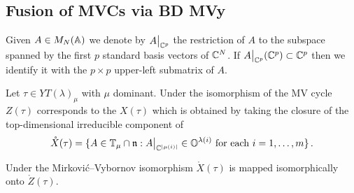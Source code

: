 \documentclass{article} %
\begin{document}
% 
% 
% 
\subsection{Fusion of MVCs via BD MVy}


Given $A \in M_N(\AA)$ we denote by $A\big|_{\CC^p}$ the restriction of $A$ to the subspace spanned by the first $p$ standard basis vectors of $\CC^N$. If $A\big|_{\CC^p}(\CC^p)\subset\CC^p$ then we identify it with the $p\times p$ upper-left submatrix of $A$. 

Let $\tau\in YT(\lambda)_\mu$ with $\mu$ dominant. Under the isomorphism of  the MV cycle $Z(\tau)$ corresponds to the  $X(\tau)$ which is obtained by taking the closure of the top-dimensional 
irreducible component of
\[
\mathring X(\tau) = 
    \{
        A \in  \TT_\mu\cap\n : A\big|_{\CC^{|\mu(i)|}} \in \OO^{\lambda(i)} \text{ for each } i = 1,\dots,m
    \}\,. 
\]
% 
\begin{lemma}
    Under the Mirkovi\'c--Vybornov isomorphism $\mathring X(\tau)$ is mapped isomorphically onto $\mathring Z(\tau)$. 
\end{lemma}
\end{document}
